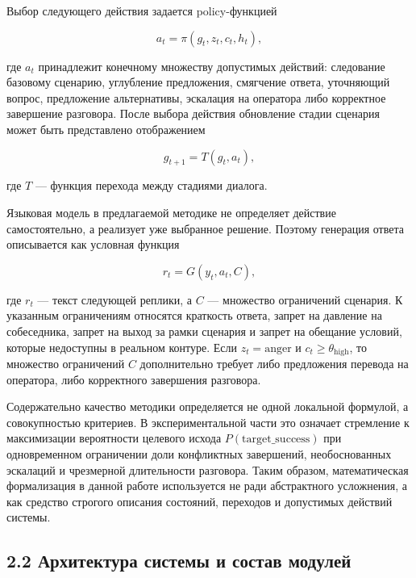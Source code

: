 \documentclass[a4paper,14pt]{extarticle}
\begin{document}
Выбор следующего действия задается policy-функцией

\begin{equation}
a_t = \pi(g_t, z_t, c_t, h_t),
\end{equation}

где \(a_t\) принадлежит конечному множеству допустимых действий:
следование базовому сценарию, углубление предложения, смягчение ответа,
уточняющий вопрос, предложение альтернативы, эскалация на оператора либо
корректное завершение разговора. После выбора действия обновление стадии
сценария может быть представлено отображением

\begin{equation}
g_{t+1} = T(g_t, a_t),
\end{equation}

где \(T\) --- функция перехода между стадиями диалога.

Языковая модель в предлагаемой методике не определяет действие
самостоятельно, а реализует уже выбранное решение. Поэтому генерация
ответа описывается как условная функция

\begin{equation}
r_t = G(y_t, a_t, C),
\end{equation}

где \(r_t\) --- текст следующей реплики, а \(C\) --- множество
ограничений сценария. К указанным ограничениям относятся краткость
ответа, запрет на давление на собеседника, запрет на выход за рамки
сценария и запрет на обещание условий, которые недоступны в реальном
контуре. Если \(z_t = \mathrm{anger}\) и
\(c_t \ge \theta_{\mathrm{high}}\), то множество ограничений \(C\)
дополнительно требует либо предложения перевода на оператора, либо
корректного завершения разговора.

Содержательно качество методики определяется не одной локальной
формулой, а совокупностью критериев. В экспериментальной части это
означает стремление к максимизации вероятности целевого исхода
\(P(\mathrm{target\_success})\) при одновременном ограничении доли
конфликтных завершений, необоснованных эскалаций и чрезмерной
длительности разговора. Таким образом, математическая формализация в
данной работе используется не ради абстрактного усложнения, а как
средство строгого описания состояний, переходов и допустимых действий
системы.

\subsection{2.2 Архитектура системы и состав
модулей}\label{ux430ux440ux445ux438ux442ux435ux43aux442ux443ux440ux430-ux441ux438ux441ux442ux435ux43cux44b-ux438-ux441ux43eux441ux442ux430ux432-ux43cux43eux434ux443ux43bux435ux439}
\end{document}
